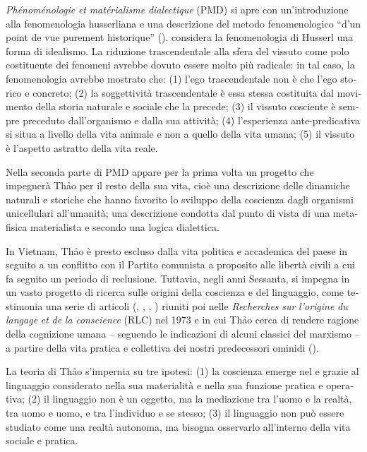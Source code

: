 \documentclass[italian,output=paper,colorlinks,citecolor=brown]{../langscibook}
\begin{document}
\begin{otherlanguage}{italian}
\textit{Phénoménologie} \textit{et} \textit{matérialisme} \textit{dialectique} (PMD) si apre con un’introduzione alla fenomenologia husserliana e una descrizione del metodo fenomenologico “d’un point de vue purement historique” (\citealt[5]{Thao1951}). \citet[7]{Thao1951} considera la fenomenologia di Husserl una forma di idealismo. La riduzione trascendentale alla sfera del vissuto come polo costituente dei fenomeni avrebbe dovuto essere molto più radicale: in tal caso, la fenomenologia avrebbe mostrato che: (1) l’ego trascendentale non è che l’ego storico e concreto; (2) la soggettività trascendentale è essa stessa costituita dal movimento della storia naturale e sociale che la precede; (3) il vissuto cosciente è sempre preceduto dall’organismo e dalla sua attività; (4) l’esperienza ante-predicativa si situa a livello della vita animale e non a quello della vita umana; (5) il vissuto è l’aspetto astratto della vita reale.

Nella seconda parte di PMD appare per la prima volta un progetto che impegnerà Th\textlatin{ả}o per il resto della sua vita, cioè una descrizione delle dinamiche naturali e storiche che hanno favorito lo sviluppo della coscienza dagli organismi unicellulari all’umanità; una descrizione condotta dal punto di vista di una metafisica materialista e secondo una logica dialettica.

In Vietnam, Thảo è presto escluso dalla vita politica e accademica del paese in seguito a un conflitto con il Partito comunista a proposito alle libertà civili a cui fa seguito un periodo di reclusione. Tuttavia, negli anni Sessanta, si impegna in un vasto progetto di ricerca sulle origini della coscienza e del linguaggio, come testimonia una serie di articoli (\citealt{Thao1966}, \citeyear{Thao1969I}, \citeyear{Thao1969II}, \citeyear{Thao1970}) riuniti poi nelle \textit{Recherches} \textit{sur} \textit{l’origine} \textit{du} \textit{langage} \textit{et} \textit{de} \textit{la} \textit{conscience} (RLC) nel 1973 e in cui Thảo cerca di rendere ragione della cognizione umana – seguendo le indicazioni di alcuni classici del marxismo – a partire della vita pratica e collettiva dei nostri predecessori ominidi (\citealt{Federici1970, Caveing1974, Haudricourt1974, Frédéric1974}).

La teoria di Thảo s’impernia su tre ipotesi: (1) la coscienza emerge nel e grazie al linguaggio considerato nella sua materialità e nella sua funzione pratica e operativa; (2) il linguaggio non è un oggetto, ma la mediazione tra l’uomo e la realtà, tra uomo e uomo, e tra l’individuo e se stesso; (3) il linguaggio non può essere studiato come una realtà autonoma, ma bisogna osservarlo all’interno della vita sociale e pratica.


\end{otherlanguage}
\end{document}

